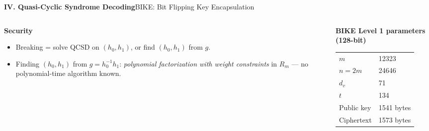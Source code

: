\begin{frame}[shrink=5]{\textbf{IV. Quasi-Cyclic Syndrome Decoding}}{BIKE: Bit Flipping Key Encapsulation}
\begin{columns}[T,onlytextwidth]
\begin{column}{.50\textwidth}
\textcolor{TealDarkCyan}{\textbf{Security}}
\begin{itemize}
  \item Breaking = solve QCSD on $(h_0,h_1)$, or find $(h_0,h_1)$ from $g$.
  \item Finding $(h_0,h_1)$ from $g=h_0^{-1}h_1$: \emph{polynomial factorization with weight constraints} in $R_m$ — no polynomial-time algorithm known.
\end{itemize}
\end{column}
\begin{column}{.46\textwidth}
\textcolor{TealDarkCyan}{\textbf{BIKE Level 1 parameters (128-bit)}}
\begin{center}
\renewcommand{\arraystretch}{1.1}
\begin{tabular}{ll}
  $m$ & 12323 \\
  $n=2m$ & 24646 \\
  $d_v$ & 71 \\
  $t$ & 134 \\
  Public key & 1541 bytes \\
  Ciphertext & 1573 bytes \\
\end{tabular}
\end{center}
\end{column}
\end{columns}
\end{frame}

